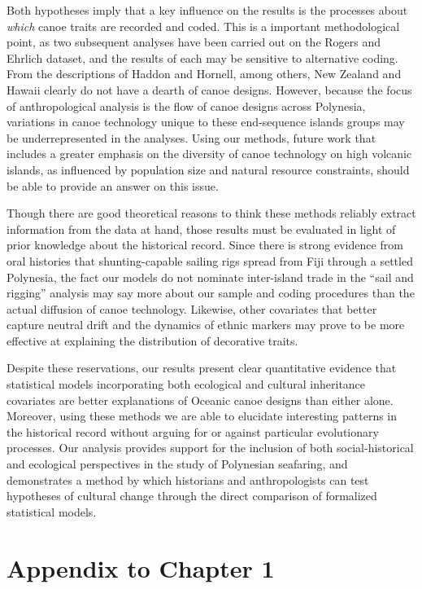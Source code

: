 Both hypotheses imply that a key influence on the results is the processes about \textit{which} canoe traits are recorded and coded.  This is a important methodological point, as two subsequent analyses \citep{RogersFeldmanEhrlich2009,GrayBryantGreenhill2010} have been carried out on the Rogers and Ehrlich \citeyearpar{Rogers2008:Canoes} dataset, and the results of each may be sensitive to alternative coding.  From the descriptions of Haddon and Hornell, among others, New Zealand and Hawaii clearly do not have a dearth of canoe designs.  However, because the focus of anthropological analysis is the flow of canoe designs across Polynesia, variations in canoe technology unique to these end-sequence islands groups may be underrepresented in the analyses.  Using our methods, future work that includes a greater emphasis on the diversity of canoe technology on high volcanic islands, as influenced by population size and natural resource constraints, should be able to provide an answer on this issue.

Though there are good theoretical reasons to think these methods reliably extract information from the data at hand, those results must be evaluated in light of prior knowledge about the historical record.  Since there is strong evidence from oral histories that shunting-capable sailing rigs spread from Fiji through a settled Polynesia, the fact our models do not nominate inter-island trade in the ``sail and rigging'' analysis may say more about our sample and coding procedures than the actual diffusion of canoe technology.  Likewise, other covariates that better capture neutral drift and the dynamics of ethnic markers may prove to be more effective at explaining the distribution of decorative traits. 

Despite these reservations, our results present clear quantitative evidence that statistical models incorporating both ecological and cultural inheritance covariates are better explanations of Oceanic canoe designs than either alone.  Moreover, using these methods we are able to elucidate interesting patterns in the historical record without arguing for or against particular evolutionary processes.  Our analysis provides support for the inclusion of both social-historical and ecological perspectives in the study of Polynesian seafaring, and demonstrates a method by which historians and anthropologists can test hypotheses of cultural change through the direct comparison of formalized statistical models.  

\newpage
\section{Appendix to Chapter 1}


